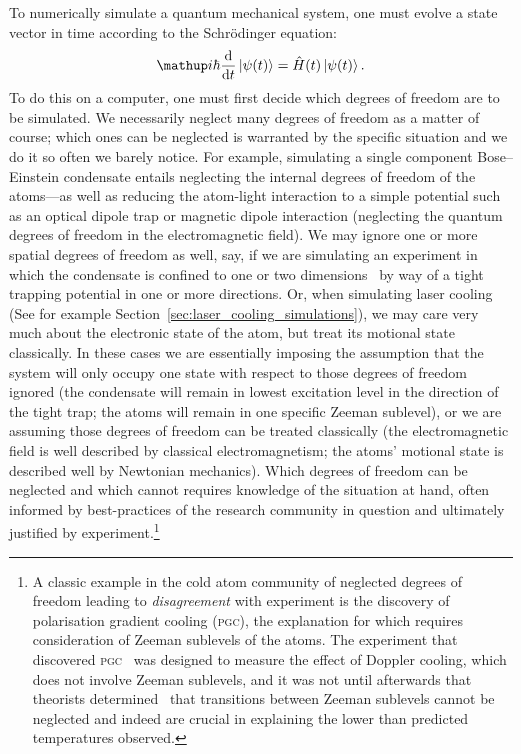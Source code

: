 To numerically simulate a quantum mechanical system, one must evolve a state vector in time according to the Schr\"odinger equation:
\begin{align}\label{eq:schrodinger_equation}
\ii\hbar\dv{t}\ket{\psi(t)} = \hat H (t) \ket{\psi(t)}.
\end{align}
To do this on a computer, one must first decide which degrees of freedom are to be simulated. We necessarily neglect many degrees of freedom as a matter of course; which ones can be neglected is warranted by the specific situation and we do it so often we barely notice. For example, simulating a single component Bose--Einstein condensate entails neglecting the internal degrees of freedom of the atoms---as well as reducing the atom-light interaction to a simple potential such as an optical dipole trap or magnetic dipole interaction (neglecting the quantum degrees of freedom in the electromagnetic field). We may ignore one or more spatial degrees of freedom as well, say, if we are simulating an experiment in which the condensate is confined to one or two dimensions~\cite{gorlitz_realization_2001, hofferberth_non-equilibrium_2007, rauer_cooling_2016} by way of a tight trapping potential in one or more directions. Or, when simulating laser cooling (See for example Section~\ref{sec:laser_cooling_simulations}), we may care very much about the electronic state of the atom, but treat its motional state classically. In these cases we are essentially imposing the assumption that the system will only occupy one state with respect to those degrees of freedom ignored (the condensate will remain in lowest excitation level in the direction of the tight trap; the atoms will remain in one specific Zeeman sublevel), or we are assuming those degrees of freedom can be treated classically (the electromagnetic field is well described by classical electromagnetism; the atoms' motional state is described well by Newtonian mechanics). Which degrees of freedom can be neglected and which cannot requires knowledge of the situation at hand, often informed by best-practices of the research community in question and ultimately justified by experiment.\footnote{A classic example in the cold atom community of neglected degrees of freedom leading to \emph{disagreement} with experiment is the discovery of polarisation gradient cooling (\textsc{pgc}), the explanation for which requires consideration of Zeeman sublevels of the atoms. The experiment that discovered \textsc{pgc}~\cite{lett_observation_1988} was designed to measure the effect of Doppler cooling, which does not involve Zeeman sublevels, and it was not until afterwards that theorists determined~\cite{dalibard_laser_1989} that transitions between Zeeman sublevels cannot be neglected and indeed are crucial in explaining the lower than predicted temperatures observed.}

